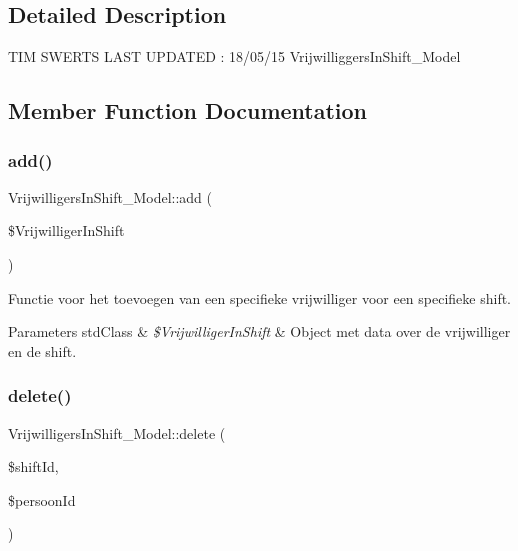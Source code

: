 \subsection{Detailed Description}
T\+IM S\+W\+E\+R\+TS L\+A\+ST U\+P\+D\+A\+T\+ED \+: 18/05/15 Vrijwilliggers\+In\+Shift\+\_\+\+Model 

\subsection{Member Function Documentation}
\mbox{\label{class_vrijwilligers_in_shift___model_ace0abb83991ff90729515c3e86c0a3ac}} 
\subsubsection{\texorpdfstring{add()}{add()}}
{\footnotesize\ttfamily Vrijwilligers\+In\+Shift\+\_\+\+Model\+::add (\begin{DoxyParamCaption}\item[{}]{\$\+Vrijwilliger\+In\+Shift }\end{DoxyParamCaption})}

Functie voor het toevoegen van een specifieke vrijwilliger voor een specifieke shift. 
\begin{DoxyParams}[1]{Parameters}
std\+Class & {\em \$\+Vrijwilliger\+In\+Shift} & Object met data over de vrijwilliger en de shift. \\
\hline
\end{DoxyParams}
\mbox{\label{class_vrijwilligers_in_shift___model_a62d1d1920e3c5a73f117ad9293260d67}} 
\subsubsection{\texorpdfstring{delete()}{delete()}}
{\footnotesize\ttfamily Vrijwilligers\+In\+Shift\+\_\+\+Model\+::delete (\begin{DoxyParamCaption}\item[{}]{\$shift\+Id,  }\item[{}]{\$persoon\+Id }\end{DoxyParamCaption})}

